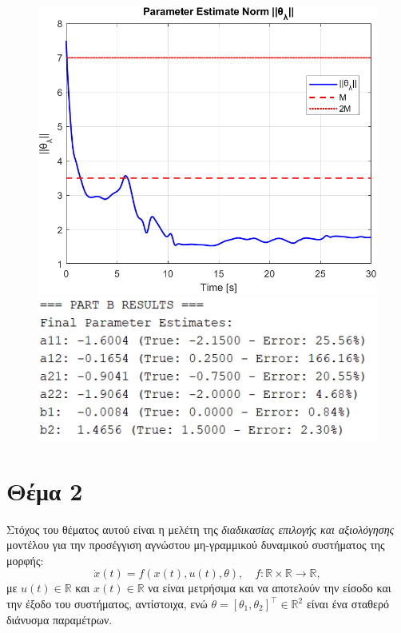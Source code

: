 \documentclass[12pt]{article} %
\numberwithin{equation}{section}  %
\begin{document}
\begin{figure}[ht!]
    \centering
    \begin{minipage}{0.49\textwidth}
        \centering
        \includegraphics[width=0.55\linewidth]{plots/plot7_12_theta_o2.png}
    \end{minipage}
    \hfill
    \begin{minipage}{0.49\textwidth}
        \centering
        \includegraphics[width=0.65\linewidth]{plots/plot7_13_logs_o2.png}
    \end{minipage}
    
    \caption{}
    \label{fig:B_est_o2}
\end{figure}





\newpage

\section{Θέμα 2}

Στόχος του θέματος αυτού είναι η μελέτη της \textit{διαδικασίας επιλογής και αξιολόγησης} μοντέλου 
για την προσέγγιση αγνώστου μη-γραμμικού δυναμικού συστήματος της μορφής:
\begin{equation}\label{t2:sys_form}
    \dot x (t) = f(x(t), u(t), \theta), \quad f: \mathbb{R} \times \mathbb{R} \rightarrow \mathbb{R}, 
\end{equation}
με $u(t) \in \mathbb{R}$ και $x(t)\in \mathbb{R}$ να είναι μετρήσιμα και να αποτελούν την είσοδο και την έξοδο του συστήματος, αντίστοιχα, ενώ
$\theta = [\theta_1, \theta_2]^{\top} \in \mathbb{R}^2$ είναι ένα σταθερό διάνυσμα παραμέτρων. 
\end{document}
